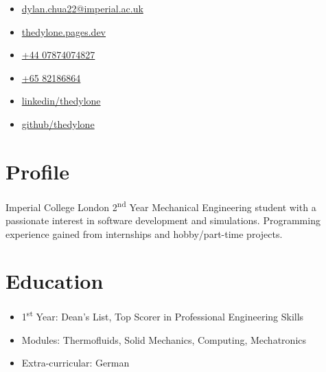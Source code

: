 \documentclass{cv}
\begin{document}
\begin{minipage}[h]{.33\textwidth-0.33\margin}
    \begin{itemize}
        \setlength{\itemsep}{0.5em}
        \item[\Large\faAt] \href{mailto:dylan.chua22@imperial.ac.uk}{dylan.chua22@imperial.ac.uk}
        \item[\Large\faLaptop] \href{https://thedylone.pages.dev}{thedylone.pages.dev}
    \end{itemize}
\end{minipage}
\hfill
\begin{minipage}[h]{.33\textwidth-0.33\margin}
    \vspace{0.5em}
    \begin{itemize}
        \centering
        \setlength{\itemsep}{0.5em}
        \item[\Large\faMobile] \href{tel:4407874074827}{+44 07874074827}
        \item[\Large\faMobile] \href{tel:6582186864}{+65 82186864}
    \end{itemize}
\end{minipage}
\hfill
\begin{minipage}[h]{.33\textwidth-0.33\margin}
    \vspace{0.5em}
    \begin{itemize}
        \raggedleft
        \setlength{\itemsep}{0.5em}
        \item[\Large\faLinkedinSquare] \href{https://www.linkedin.com/in/thedylone/}{linkedin/thedylone}
        \item[\Large\faGithub] \href{https://github.com/thedylone}{github/thedylone}
    \end{itemize}
\end{minipage}

\section{Profile}
\raggedright
Imperial College London 2\textsuperscript{nd} Year Mechanical Engineering student with a passionate interest in software development and simulations. Programming experience gained from internships and hobby/part-time projects.

\section{Education}
\begin{subsections}
    \subtitle{MEng Mechanical Engineering \hfill London, United Kingdom}
    \begin{itemize}
        \item 1\textsuperscript{st} Year: Dean's List, Top Scorer in Professional Engineering Skills
        \item Modules: Thermofluids, Solid Mechanics, Computing, Mechatronics
        \item Extra-curricular: German
    \end{itemize}
\end{subsections}
\end{document}

